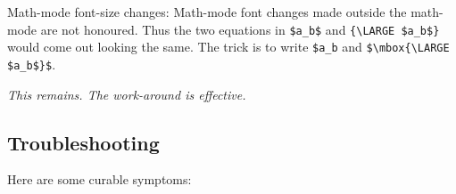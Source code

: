 \begin{htmllist}
\item [Math-mode font-size changes: ]  Math-mode font changes
made outside the math-mode are not honoured.  Thus the two equations
in \verb|$a_b$| and \verb|{\LARGE $a_b$}|
would come out looking the same.  The trick is to write
\verb|$a_b| and \verb|$\mbox{\LARGE $a_b$}$|.
\begin{changebar}
\newline\textit
{This remains. The work-around is effective.}
\end{changebar}
\end{htmllist}



\subsection{Troubleshooting}%
%
Here are some curable symptoms:

